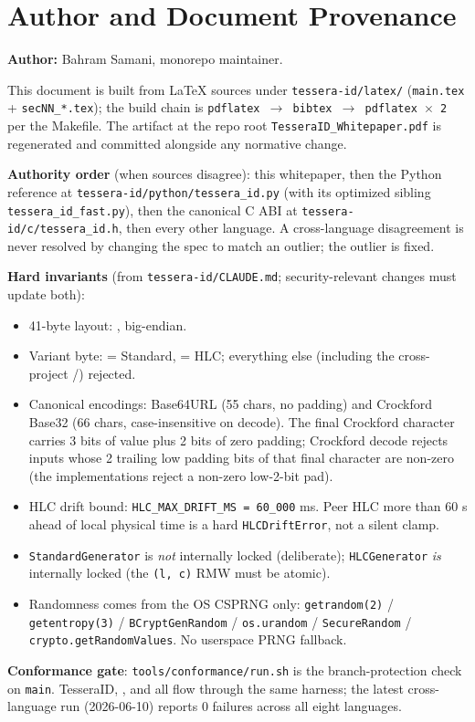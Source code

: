 \section{Author and Document Provenance}
\label{sec:appendix-provenance}

\textbf{Author:} Bahram Samani, \tessera{} monorepo maintainer.

This document is built from LaTeX sources under \texttt{tessera-id/latex/} (\texttt{main.tex} + \texttt{secNN\_*.tex}); the build chain is \texttt{pdflatex $\rightarrow$ bibtex $\rightarrow$ pdflatex $\times$ 2} per the Makefile. The artifact at the repo root \texttt{TesseraID\_Whitepaper.pdf} is regenerated and committed alongside any normative change.

\textbf{Authority order} (when sources disagree): this whitepaper, then the Python reference at \texttt{tessera-id/python/tessera\_id.py} (with its optimized sibling \texttt{tessera\_id\_fast.py}), then the canonical C ABI at \texttt{tessera-id/c/tessera\_id.h}, then every other language. A cross-language disagreement is never resolved by changing the spec to match an outlier; the outlier is fixed.

\textbf{Hard invariants} (from \texttt{tessera-id/CLAUDE.md}; security-relevant changes must update both):
\begin{itemize}
\item 41-byte layout: , big-endian.
\item Variant byte:  = Standard,  = HLC; everything else (including the cross-project /) rejected.
\item Canonical encodings: Base64URL (55 chars, no padding) and Crockford Base32 (66 chars, case-insensitive on decode). The final Crockford character carries 3 bits of value plus 2 bits of zero padding; Crockford decode rejects inputs whose 2 trailing low padding bits of that final character are non-zero (the implementations reject a non-zero low-2-bit pad).
\item HLC drift bound: \texttt{HLC\_MAX\_DRIFT\_MS = 60\_000} ms. Peer HLC more than 60 s ahead of local physical time is a hard \texttt{HLCDriftError}, not a silent clamp.
\item \texttt{StandardGenerator} is \emph{not} internally locked (deliberate); \texttt{HLCGenerator} \emph{is} internally locked (the \texttt{(l, c)} RMW must be atomic).
\item Randomness comes from the OS CSPRNG only: \texttt{getrandom(2)} / \texttt{getentropy(3)} / \texttt{BCryptGenRandom} / \texttt{os.urandom} / \texttt{SecureRandom} / \texttt{crypto.getRandomValues}. No userspace PRNG fallback.
\end{itemize}

\textbf{Conformance gate}: \texttt{tools/conformance/run.sh} is the branch-protection check on \texttt{main}. TesseraID, \tesserahash{}, and \tesseraseal{} all flow through the same harness; the latest cross-language run (2026-06-10) reports 0 failures across all eight languages.

